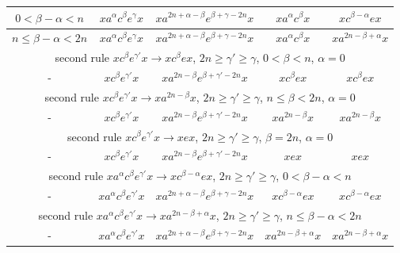 \documentclass{article}
\theoremstyle{definition}
\begin{document}
\begin{center}
\begin{tabular}{|c|c|c|c|c|}
\hline
$0<\beta-\alpha<n$ &  $ x a^\alpha c^{\beta}  e^\gamma x $ &  $  x a^{2n+\alpha - \beta} e^{\beta+\gamma-2n}  x $ &   $   x a^{\alpha} c^\beta  x  $ &  $ x  c^{\beta - \alpha} e x $\\
\hline
$n \le \beta-\alpha<2n$   &  $ x a^\alpha c^{\beta}  e^\gamma x $ &  $  x  a^{2n+\alpha - \beta} e^{\beta+\gamma-2n}  x $ &   $   x a^{\alpha} c^\beta  x  $ &  $ x a^{2n- \beta + \alpha} x $\\
\hline
\multicolumn{5}{|c|}{second rule $x c^\beta e^{\gamma'} x  \rightarrow x c^{\beta}e x$, $2n\ge \gamma' \ge \gamma$,  $0 < \beta < n$, $\alpha = 0$}\\
\hline
- &  $ x c^{\beta}  e^{\gamma'}  x$ &  $ x  a^{2n - \beta} e^{\beta+\gamma'-2n}  x$ &  $   x c^\beta e x  $ & $ x c^\beta e x  $\\
\hline
\multicolumn{5}{|c|}{second rule $x c^\beta e^{\gamma'} x  \rightarrow x a^{2n-\beta} x$, $2n\ge \gamma' \ge \gamma$,  $n \le \beta < 2n$, $\alpha = 0$}\\
\hline
- &  $ x c^{\beta}  e^{\gamma'}  x$ &  $ x  a^{2n - \beta} e^{\beta+\gamma'-2n}  x$ &  $   x a^{2n-\beta} x  $ & $ x a^{2n-\beta} x $\\
\hline
\multicolumn{5}{|c|}{second rule $x c^\beta e^{\gamma'} x  \rightarrow x e x$, $2n\ge \gamma' \ge \gamma$,  $\beta = 2n$, $\alpha = 0$}\\
\hline
- &  $ x c^{\beta}  e^{\gamma'}  x$ &  $ x  a^{2n - \beta} e^{\beta+\gamma'-2n}  x$ &  $   x e x  $ & $ x e x $\\
\hline
\multicolumn{5}{|c|}{second rule $x a^{\alpha} c^\beta e^{\gamma'} x  \rightarrow x c^{\beta -\alpha}e x$, $2n\ge \gamma' \ge \gamma$,  $0< \beta -\alpha < n$}\\
\hline
- &  $ x a^\alpha c^{\beta}  e^{\gamma'}  x$ &  $ x  a^{2n+\alpha - \beta} e^{\beta+\gamma-2n}  x$ &  $   x c^{\beta -\alpha}e x  $ & $ x c^{\beta -\alpha}e x  $\\
\hline
\multicolumn{5}{|c|}{second rule $x a^{\alpha} c^\beta e^{\gamma'} x  \rightarrow x a^{2n-\beta +\alpha} x$, $2n\ge \gamma' \ge \gamma$,  $n \le \beta -\alpha < 2n$}\\
\hline
- &  $ x a^\alpha c^{\beta}  e^{\gamma'}  x$ &  $ x  a^{2n+\alpha - \beta} e^{\beta+\gamma-2n}  x$ &  $   x a^{2n-\beta +\alpha} x  $ & $ x a^{2n-\beta +\alpha} x  $\\
\hline
\end{tabular}
\end{center}
\end{document}
